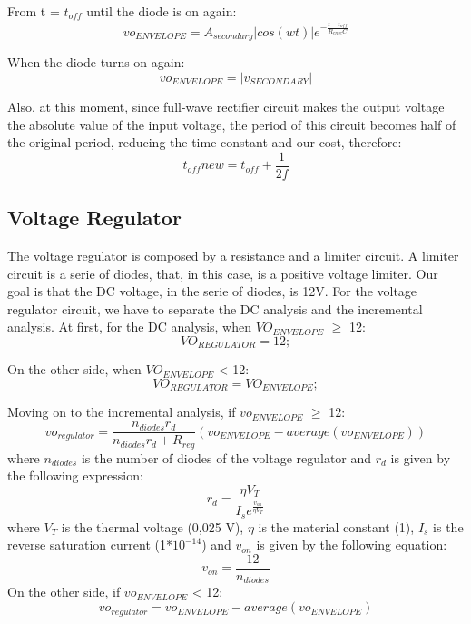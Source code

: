 \noindent From t = $t_{off}$ until the diode is on again:
\begin{equation}
vo_{ENVELOPE} = A_{secondary}|cos(wt)|e^{-\frac{t - t_{off}}{R_{enve}C}}
  \label{eq:t > toff}
\end{equation}

\noindent When the diode turns on again:
\begin{equation}
vo_{ENVELOPE} = |v_{SECONDARY}|
  \label{eq:t > ton}
\end{equation}

\noindent Also, at this moment, since full-wave rectifier circuit makes the output voltage the absolute value of the input voltage, 
the period of this circuit becomes half of the original period, reducing the time constant and our cost, therefore:
\begin{equation}
t_{off}new = t_{off} + \frac{1}{2f}
  \label{eq:new toff}
\end{equation}

\newpage
\subsection{Voltage Regulator}
\label{reg}
\noindent The voltage regulator is composed by a resistance and a limiter circuit. A limiter circuit is a serie of diodes, that, in this case, 
is a positive voltage limiter. Our goal is that the DC voltage, in the serie of diodes, is 12V. 
\noindent For the voltage regulator circuit, we have to separate the DC analysis and the incremental analysis.
\noindent At first, for the DC analysis, when $VO_{ENVELOPE}$ $\geq$ 12:
\begin{equation}
VO_{REGULATOR} = 12;
  \label{eq:dc1}
\end{equation}

\noindent On the other side, when $VO_{ENVELOPE}$ < 12:
\begin{equation}
VO_{REGULATOR} = VO_{ENVELOPE};
  \label{eq:dc2}
\end{equation}

\noindent Moving on to the incremental analysis, if $vo_{ENVELOPE}$ $\geq$ 12:
\begin{equation}
vo_{regulator} = \frac {n_{diodes}r_d}{n_{diodes}r_d + R_{reg}}(vo_{ENVELOPE} - average(vo_{ENVELOPE}))
  \label{eq:ac1}
\end{equation}
\noindent where $n_{diodes}$ is the number of diodes of the voltage regulator and $r_d$ is given by the following expression:
\begin{equation}
r_d = \frac{\eta V_T}{I_se^{\frac{v_{on}}{\eta V_T}}}
  \label{eq:rd}
\end{equation}
\noindent where $V_T$ is the thermal voltage (0,025 V), $\eta$ is the material constant (1), $I_s$ is the reverse saturation current (1*$10^{-14}$) 
and $v_{on}$ is given by the following equation:
\begin{equation}
v_{on} = \frac{12}{n_{diodes}}
  \label{eq:von}
\end{equation}
\noindent On the other side, if $vo_{ENVELOPE}$ < 12:
\begin{equation}
vo_{regulator} = vo_{ENVELOPE} - average(vo_{ENVELOPE})
  \label{eq:ac2}
\end{equation}

